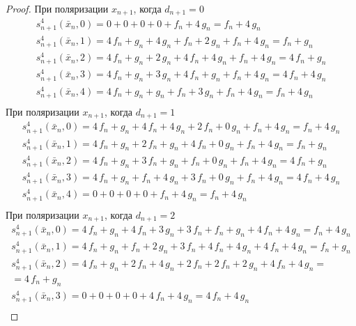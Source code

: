 \documentclass[bibliography=totoc, a4paper, 14pt]{extarticle}
\begin{document}
 \begin{proof}


При поляризации $x_{n+1}$, когда $d_{n+1} = 0$
$$\begin{array}{l}
s_{n+1}^4(\bar{x}_n, 0) = 0 + 0 + 0 + 0 + f_n + 4\,g_n = f_n + 4\,g_n \\
s_{n+1}^4(\bar{x}_n, 1) = 4\,f_n + g_n + 4\,g_n + f_n + 2\,g_n + f_n + 4\,g_n = f_n + g_n \\
s_{n+1}^4(\bar{x}_n, 2) = 4\,f_n + g_n + 2\,g_n + 4\,f_n + 4\,g_n + f_n + 4\,g_n = 4\,f_n + g_n \\
s_{n+1}^4(\bar{x}_n, 3) = 4\,f_n + g_n + 3\,g_n + 4\,f_n + g_n + f_n + 4\,g_n = 4\,f_n + 4\,g_n \\
s_{n+1}^4(\bar{x}_n, 4) = 4\,f_n + g_n + g_n + f_n + 3\,g_n + f_n + 4\,g_n = f_n + 4\,g_n \\
\end{array}$$
При поляризации $x_{n+1}$, когда $d_{n+1} = 1$
$$\begin{array}{l}
s_{n+1}^4(\bar{x}_n, 0) = 4\,f_n + g_n + 4\,f_n + 4\,g_n + 2\,f_n + 0\,g_n + f_n + 4\,g_n = f_n + 4\,g_n \\
s_{n+1}^4(\bar{x}_n, 1) = 4\,f_n + g_n + 2\,f_n + g_n + 4\,f_n + 0\,g_n + f_n + 4\,g_n = f_n + g_n \\
s_{n+1}^4(\bar{x}_n, 2) = 4\,f_n + g_n + 3\,f_n + g_n + f_n + 0\,g_n + f_n + 4\,g_n = 4\,f_n + g_n \\
s_{n+1}^4(\bar{x}_n, 3) = 4\,f_n + g_n + f_n + 4\,g_n + 3\,f_n + 0\,g_n + f_n + 4\,g_n = 4\,f_n + 4\,g_n \\
s_{n+1}^4(\bar{x}_n, 4) = 0 + 0 + 0 + 0 + f_n + 4\,g_n = f_n + 4\,g_n \\
\end{array}$$
При поляризации $x_{n+1}$, когда $d_{n+1} = 2$
$$\begin{array}{l}
s_{n+1}^4(\bar{x}_n, 0) = 4\,f_n + g_n + 4\,f_n + 3\,g_n + 3\,f_n + f_n + g_n + 4\,f_n + 4\,g_n = f_n + 4\,g_n \\
s_{n+1}^4(\bar{x}_n, 1) = 4\,f_n + g_n + f_n + 2\,g_n + 3\,f_n + 4\,f_n + 4\,g_n + 4\,f_n + 4\,g_n = f_n + g_n \\
s_{n+1}^4(\bar{x}_n, 2) = 4\,f_n + g_n + 2\,f_n + 4\,g_n + 2\,f_n + 2\,f_n + 2\,g_n + 4\,f_n + 4\,g_n =\\
= 4\,f_n + g_n \\
s_{n+1}^4(\bar{x}_n, 3) = 0 + 0 + 0 + 0 + 4\,f_n + 4\,g_n = 4\,f_n + 4\,g_n \\

\end{array}$$
\end{proof}
\end{document}
